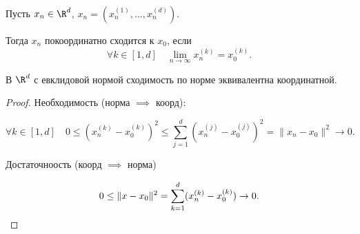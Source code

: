 \begin{definition} \thmslashn 

    Пусть $x_{n}\in \R^{d}$, $x_{n} = (x_n^{(1)}, \ldots, x_{n}^{(d)})$.

    Тогда $x_{n}$ покоординатно сходится к $x_0$, если
    \[ \forall{k\in [1, d]}\quad \lim\limits_{n \to \infty} x_{n}^{(k)} = x_0^{(k)} .\] 
\end{definition}
\begin{theorem} \label{q20_th2.7} \thmslashn

    В $\R^{d}$ с евклидовой нормой сходимость по норме эквивалентна координатной.
    \begin{proof} \thmslashn
    
        Необходимость (норма $\implies$ коорд):

        \[ \forall{k\in [1, d]}\quad 0 \le (x_{n}^{(k)} - x_0^{(k)})^2 \le \sum\limits_{j=1}^{d} (x_{n}^{(j)} - x_{0}^{(j)})^2 = \|x_{n} - x_0\|^2 \to 0.\]

    Достаточноость (коорд $\implies$ норма)

    \[ 0 \le \|x - x_0\|^2 = \sum\limits_{k=1}^{d} (x_{n}^{(k)} - x_{0}^{(k)}) \to 0. \qedhere\] 
    \end{proof}
\end{theorem}
